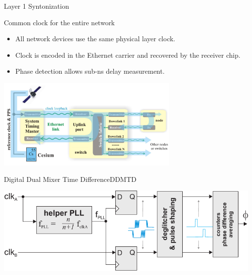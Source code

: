 \documentclass[compress, red]{beamer}
\begin{document}
\begin{frame}{Layer 1 Syntonization}

 \begin{block}{Common clock for the entire network}
    \begin{itemize}
	 \item All network devices use the same physical layer clock.
	 \item Clock is encoded in the Ethernet carrier and recovered by the receiver chip.
	 \item Phase detection allows sub-ns delay measurement.
    \end{itemize}
\end{block}

\vspace{-0.2cm}

\begin{center}
\includegraphics[height=4.5cm]{../../figures/misc/synce_v3.pdf}
\end{center}

\end{frame}

\begin{frame}{Digital Dual Mixer Time Difference}{DDMTD}

\begin{center}
\includegraphics[width=\textwidth]{../../figures/misc/dmtd.pdf}
\end{center}

\end{frame}
\end{document}

